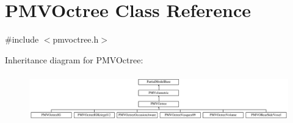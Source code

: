 \hypertarget{classPMVOctree}{}\section{P\+M\+V\+Octree Class Reference}
\label{classPMVOctree}


{\ttfamily \#include $<$pmvoctree.\+h$>$}

Inheritance diagram for P\+M\+V\+Octree\+:\begin{figure}[H]
\begin{center}
\leavevmode
\includegraphics[height=2.097378cm]{classPMVOctree}
\end{center}
\end{figure}
